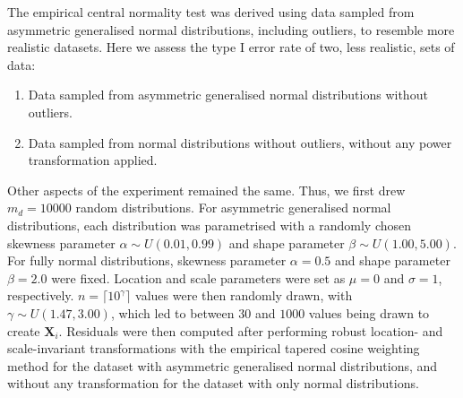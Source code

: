 \documentclass[preprint,12pt,authoryear]{elsarticle}
\begin{document}
The empirical central normality test was derived using data sampled from
asymmetric generalised normal distributions, including outliers, to
resemble more realistic datasets. Here we assess the type I error rate
of two, less realistic, sets of data:

\begin{enumerate}
\def\labelenumi{\arabic{enumi}.}
\item
  Data sampled from asymmetric generalised normal distributions without
  outliers.
\item
  Data sampled from normal distributions without outliers, without any
  power transformation applied.
\end{enumerate}

Other aspects of the experiment remained the same. Thus, we first drew
\(m_d=10000\) random distributions. For asymmetric generalised normal
distributions, each distribution was parametrised with a randomly chosen
skewness parameter \(\alpha \sim U\left(0.01, 0.99\right)\) and shape
parameter \(\beta \sim U\left(1.00, 5.00 \right)\). For fully normal
distributions, skewness parameter \(\alpha = 0.5\) and shape parameter
\(\beta = 2.0\) were fixed. Location and scale parameters were set as
\(\mu = 0\) and \(\sigma = 1\), respectively.
\(n = \lceil 10^\gamma \rceil\) values were then randomly drawn, with
\(\gamma \sim U\left(1.47, 3.00\right)\), which led to between \(30\)
and \(1000\) values being drawn to create \(\mathbf{X}_i\). Residuals
were then computed after performing robust location- and scale-invariant
transformations with the empirical tapered cosine weighting method for
the dataset with asymmetric generalised normal distributions, and
without any transformation for the dataset with only normal
distributions.
\end{document}
